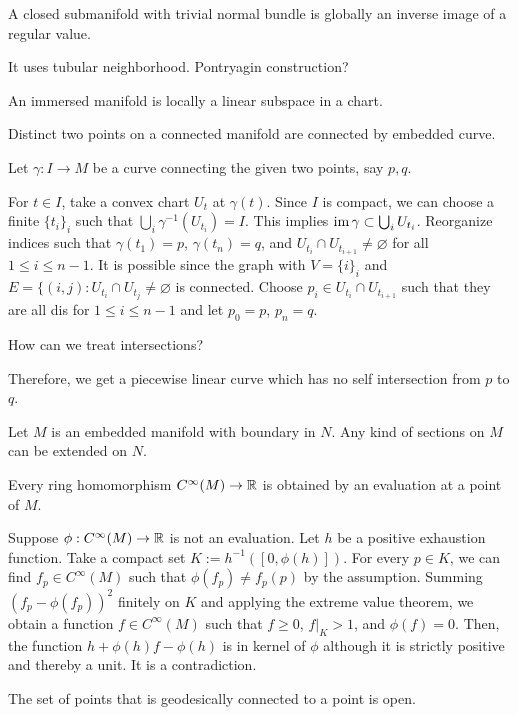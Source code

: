 \documentclass[12pt]{article}
\begin{document}
\begin{prop}
A closed submanifold with trivial normal bundle is globally an inverse image of a regular value.
\end{prop}
\begin{pf}
It uses tubular neighborhood.
Pontryagin construction?
\end{pf}

\begin{prop}
An immersed manifold is locally a linear subspace in a chart.
\end{prop}

\begin{prop}
Distinct two points on a connected manifold are connected by embedded curve.
\end{prop}
\begin{pf}
Let $\gamma:I\to M$ be a curve connecting the given two points, say $p,q$.

For $t\in I$, take a convex chart $U_t$ at $\gamma(t)$.
Since $I$ is compact, we can choose a finite $\{t_i\}_i$ such that $\bigcup_i\gamma^{-1}(U_{t_i})=I$.
This implies $\operatorname{im}\gamma\subset\bigcup_iU_{t_i}$.
Reorganize indices such that $\gamma(t_1)=p$, $\gamma(t_n)=q$, and $U_{t_i}\cap U_{t_{i+1}}\ne\varnothing$ for all $1\le i\le n-1$.
It is possible since the graph with $V=\{i\}_i$ and $E=\{(i,j):U_{t_i}\cap U_{t_j}\ne\varnothing$ is connected.
Choose $p_i\in U_{t_i}\cap U_{t_{i+1}}$ such that they are all dis for $1\le i\le n-1$ and let $p_0=p$, $p_n=q$.

How can we treat intersections?

Therefore, we get a piecewise linear curve which has no self intersection from $p$ to $q$.

\end{pf}

\begin{prop}
Let $M$ is an embedded manifold with boundary in $N$.
Any kind of sections on $M$ can be extended on $N$.
\end{prop}

\begin{prop}
Every ring homomorphism $C^\infty(M)\to\mathbb{R}$ is obtained by an evaluation at a point of $M$.
\end{prop}
\begin{pf}
Suppose $\phi:C^\infty(M)\to\mathbb{R}$ is not an evaluation.
Let $h$ be a positive exhaustion function.
Take a compact set $K:=h^{-1}([0,\phi(h)])$.
For every $p\in K$, we can find $f_p\in C^\infty(M)$ such that $\phi(f_p)\ne f_p(p)$ by the assumption.
Summing $(f_p-\phi(f_p))^2$ finitely on $K$ and applying the extreme value theorem, we obtain a function $f\in C^\infty(M)$ such that $f\ge0$, $f|_K>1$, and $\phi(f)=0$.
Then, the function $h+\phi(h)f-\phi(h)$ is in kernel of $\phi$ although it is strictly positive and thereby a unit.
It is a contradiction.
\end{pf}


\begin{prop}
The set of points that is geodesically connected to a point is open.
\end{prop}
\end{document}
